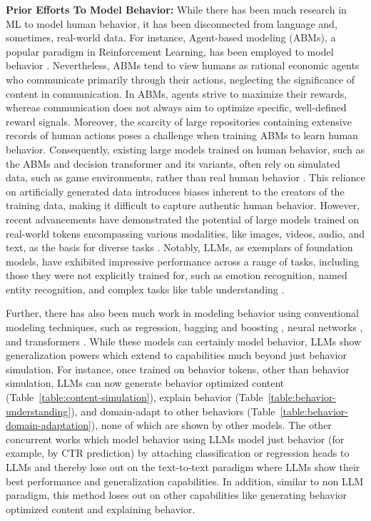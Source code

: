 \textbf{Prior Efforts To Model Behavior:} While there has been much research in ML to model human behavior, it has been disconnected from language and, sometimes, real-world data. For instance, Agent-based modeling (ABMs), a popular paradigm in Reinforcement Learning, has been employed to model behavior \cite{bankes2002agent,romero2023two,park2023generative}. Nevertheless, ABMs tend to view humans as rational economic agents who communicate primarily through their actions, neglecting the significance of content in communication. In ABMs, agents strive to maximize their rewards, whereas communication does not always aim to optimize specific, well-defined reward signals. Moreover, the scarcity of large repositories containing extensive records of human actions poses a challenge when training ABMs to learn human behavior. Consequently, existing large models trained on human behavior, such as the ABMs and decision transformer and its variants, often rely on simulated data, such as game environments, rather than real human behavior \cite{chen2021decision}. This reliance on artificially generated data introduces biases inherent to the creators of the training data, making it difficult to capture authentic human behavior. However, recent advancements have demonstrated the potential of large models trained on real-world tokens encompassing various modalities, like images, videos, audio, and text, as the basis for diverse tasks \cite{ge2023planting,li2023blip2}. Notably, LLMs, as exemplars of foundation models, have exhibited impressive performance across a range of tasks, including those they were not explicitly trained for, such as emotion recognition, named entity recognition, and complex tasks like table understanding \cite{ye2023large,bhattacharyya-etal-2023-video}.



Further, there has also been much work in modeling behavior using conventional modeling techniques, such as regression, bagging and boosting \cite{mazloom2016multimodal,villarroel2019cutting}, neural networks \cite{ding2019social,wang2018retweet,khosla2014makes}, and transformers \cite{wu2021towards,xiao2022hierarchical}. While these models can certainly model behavior, LLMs show generalization powers which extend to capabilities much beyond just behavior simulation. For instance, once trained on behavior tokens, other than behavior simulation, LLMs can now generate behavior optimized content (Table~\ref{table:content-simulation}), explain behavior (Table~\ref{table:behavior-understanding}), and domain-adapt to other behaviors (Table~\ref{table:behavior-domain-adaptation}), none of which are shown by other models. The other concurrent works which model behavior using LLMs \cite{kang2023llms} model just behavior (for example, by CTR prediction) by attaching classification or regression heads to LLMs and thereby lose out on the text-to-text paradigm where LLMs show their best performance and generalization capabilities. In addition, similar to non LLM paradigm, this method loses out on other capabilities like generating behavior optimized content and explaining behavior. 






